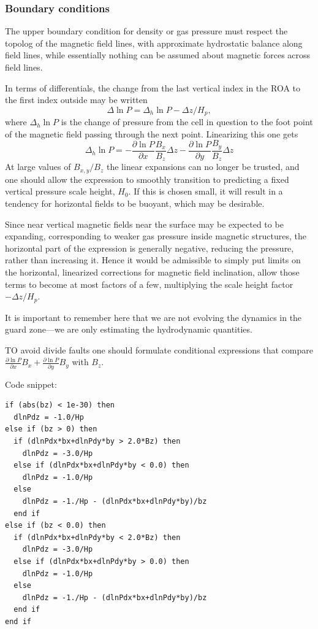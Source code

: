 \documentclass[paper=a4,fontsize=11pt]{scrartcl}
\numberwithin{equation}{section}		%
\numberwithin{figure}{section}			%
\numberwithin{table}{section}				%
\newcommand{\codecolor}{\color{Blue}}
\begin{document}
\subsubsection{Boundary conditions}
The upper boundary condition for density or gas pressure must respect the topolog of the magnetic field lines, with approximate hydrostatic balance along field lines, while essentially nothing can be assumed about magnetic forces across field lines.

In terms of differentials, the change from the last vertical index in the ROA to the first index outside may be written
\begin{equation}
    \Delta \ln P = \Delta_h \ln P - \Delta z/H_p,
\end{equation}
where $\Delta_h \ln P$ is the change of pressure from the cell in question to the foot point of the magnetic field passing through the next point.  Linearizing this one gets
\begin{equation}
    \Delta_h \ln P = 
    - \frac{\partial \ln P}{\partial x}
      \frac{B_x}{B_z} \Delta z
    - \frac{\partial \ln P}{\partial y}
      \frac{B_y}{B_z} \Delta z
\end{equation}
At large values of $B_{x,y}/B_z$ the linear expansions can no longer be trusted, and one should allow the expression to smoothly transition to predicting a fixed vertical pressure scale height, $H_0$. If this is chosen small, it will result in a tendency for horizontal fields to be buoyant, which may be desirable.

Since near vertical magnetic fields near the surface may be expected to be expanding, corresponding to weaker gas pressure inside magnetic structures, the horizontal part of the expression is generally negative, reducing the pressure, rather than increasing it.  Hence it would be admissible to simply put limits on the horizontal, linearized corrections for magnetic field inclination, allow those terms to become at most factors of a few, multiplying the scale height factor $-\Delta z/H_p$.

It is important to remember here that we are not evolving the dynamics in the guard zone---we are only estimating the hydrodynamic quantities.

TO avoid divide faults one should formulate conditional expressions that compare $\frac{\partial \ln P}{\partial x} B_x + \frac{\partial \ln P}{\partial y} B_y$ with $B_z$.

Code snippet:
{\small\codecolor\begin{verbatim}
if (abs(bz) < 1e-30) then
  dlnPdz = -1.0/Hp
else if (bz > 0) then
  if (dlnPdx*bx+dlnPdy*by > 2.0*Bz) then
    dlnPdz = -3.0/Hp
  else if (dlnPdx*bx+dlnPdy*by < 0.0) then
    dlnPdz = -1.0/Hp
  else
    dlnPdz = -1./Hp - (dlnPdx*bx+dlnPdy*by)/bz
  end if
else if (bz < 0.0) then
  if (dlnPdx*bx+dlnPdy*by < 2.0*Bz) then
    dlnPdz = -3.0/Hp
  else if (dlnPdx*bx+dlnPdy*by > 0.0) then
    dlnPdz = -1.0/Hp
  else
    dlnPdz = -1./Hp - (dlnPdx*bx+dlnPdy*by)/bz
  end if
end if
\end{verbatim}}
\end{document}
